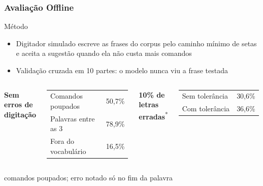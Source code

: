 \documentclass{UnBeamer}
\begin{document}
\subsubsection{Avaliação Offline}
\begin{frame}
    \small
    \begin{block}{Método}
        \begin{itemize}
            \item Digitador simulado escreve as frases do corpus pelo
                  caminho mínimo de setas e aceita a sugestão quando
                  ela não custa mais comandos
            \item Validação cruzada em 10 partes: o modelo nunca viu
                  a frase testada
        \end{itemize}
    \end{block}
    \begin{columns}[T]
            \centering
            \textbf{Sem erros de digitação}\\[1ex]
            \begin{tabular}{lr}
                \hline
                Comandos poupados   & 50,7\% \\
                Palavras entre as 3 & 78,9\% \\
                Fora do vocabulário & 16,5\% \\
                \hline
            \end{tabular}
            \centering
            \textbf{10\% de letras erradas}\textsuperscript{*}\\[1ex]
            \begin{tabular}{lr}
                \hline
                Sem tolerância & 30,6\% \\
                Com tolerância & 36,6\% \\
                \hline
            \end{tabular}
    \end{columns}
    \vspace{1ex}
    \hfill{\scriptsize * comandos poupados; erro notado só no fim da palavra}
\end{frame}
\end{document}
